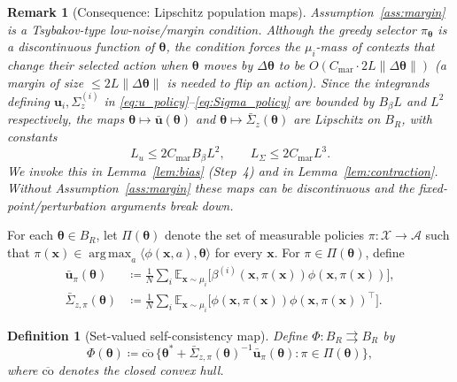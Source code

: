\documentclass[11pt]{article}
\newtheorem{definition}[theorem]{Definition}
\newtheorem*{remark}{Remark}
\DeclareMathOperator*{\argmax}{arg\,max}
\begin{document}
\begin{remark}[Consequence: Lipschitz population maps]\label{rem:lip}
Assumption~\ref{ass:margin} is a Tsybakov-type low-noise/margin
condition.  Although the greedy selector $\pi_{\bm{\theta}}$ is a
\emph{discontinuous} function of $\bm{\theta}$, the condition forces
the $\mu_i$-mass of contexts that \emph{change} their selected action
when $\bm{\theta}$ moves by $\Delta\bm{\theta}$ to be
$O(C_{\mathrm{mar}}\cdot 2L\|\Delta\bm{\theta}\|)$ (a margin of size
$\leq 2L\|\Delta\bm{\theta}\|$ is needed to flip an action).  Since
the integrands defining $\bm{u}_i,\Sigma_z^{(i)}$ in
\eqref{eq:u_policy}--\eqref{eq:Sigma_policy} are bounded by $B_\beta L$
and $L^2$ respectively, the maps
$\bm{\theta}\mapsto\bar{\bm{u}}(\bm{\theta})$ and
$\bm{\theta}\mapsto\bar{\Sigma}_z(\bm{\theta})$ are Lipschitz on $B_R$,
with constants
\[
L_u\leq 2C_{\mathrm{mar}}B_\beta L^2,\qquad
L_\Sigma\leq 2C_{\mathrm{mar}}L^3.
\]
We invoke this in Lemma~\ref{lem:bias} (Step~4) and in
Lemma~\ref{lem:contraction}.  Without
Assumption~\ref{ass:margin} these maps can be discontinuous and the
fixed-point/perturbation arguments break down.
\end{remark}

For each $\bm{\theta}\in B_R$, let $\Pi(\bm{\theta})$ denote the set of
measurable policies $\pi:\mathcal{X}\to\mathcal{A}$ such that
$\pi(\bm{x})\in\argmax_a\langle\phi(\bm{x},a),\bm{\theta}\rangle$
for every $\bm{x}$.  For $\pi\in\Pi(\bm{\theta})$, define
\begin{align*}
\bar{\bm{u}}_\pi(\bm{\theta})&\coloneqq
\tfrac{1}{N}\sum_i\mathbb{E}_{\bm{x}\sim\mu_i}
\bigl[\beta^{(i)}(\bm{x},\pi(\bm{x}))\phi(\bm{x},\pi(\bm{x}))\bigr],\\
\bar{\Sigma}_{z,\pi}(\bm{\theta})&\coloneqq
\tfrac{1}{N}\sum_i\mathbb{E}_{\bm{x}\sim\mu_i}
\bigl[\phi(\bm{x},\pi(\bm{x}))\phi(\bm{x},\pi(\bm{x}))^\top\bigr].
\end{align*}

\begin{definition}[Set-valued self-consistency map]\label{def:Phi}
Define $\Phi:B_R\rightrightarrows B_R$ by
\[
\Phi(\bm{\theta})\coloneqq
\overline{\mathrm{co}}\,\bigl\{
\bm{\theta}^{\!*}+\bar{\Sigma}_{z,\pi}(\bm{\theta})^{-1}
\bar{\bm{u}}_\pi(\bm{\theta}):\pi\in\Pi(\bm{\theta})\bigr\},
\]
where $\overline{\mathrm{co}}$ denotes the closed convex hull.
\end{definition}
\end{document}
